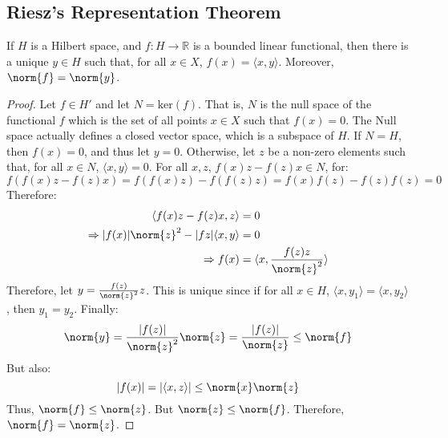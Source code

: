         \subsection{Riesz's Representation Theorem}
            \begin{theorem}
                If $H$ is a Hilbert space, and
                $f:H\rightarrow\mathbb{R}$ is a bounded
                linear functional, then there is a unique
                $y\in{H}$ such that, for all $x\in{X}$,
                $f(x)=\langle{x,y}\rangle$. Moreover,
                $\norm{f}=\norm{y}$.
            \end{theorem}
            \begin{proof}
                Let $f\in{H'}$ and let $N=\mathrm{ker}(f)$. That is,
                $N$ is the null space of the functional $f$
                which is the set of all points
                $x\in{X}$ such that $f(x)=0$. The Null space
                actually defines a closed vector space, which
                is a subspace of $H$. If $N=H$, then
                $f(x)=0$, and thus let $y=0$. Otherwise, let $z$
                be a non-zero elements such that,
                for all $x\in{N}$, $\langle{x,y}\rangle=0$.
                For all $x,z$, $f(x)z-f(z)x\in{N}$, for:
                \begin{equation*}
                    f(f(x)z-f(z)x)
                    =f(f(x)z)-f(f(z)z)
                    =f(x)f(z)-f(z)f(z)=0
                \end{equation*}
                Therefore:
                \begin{align*}
                    \langle{f(x)z-f(z)x,z}\rangle&=0\\
                    \Rightarrow
                    |f(x)|\norm{z}^{2}-|fz|\langle{x,y}\rangle&=0\\
                    \Rightarrow
                    f(x)
                    &=\langle{x,\frac{f(z)z}{\norm{z}^{2}}}\rangle
                \end{align*}
                Therefore, let $y=\frac{f(z)}{\norm{z}^{2}}z$.
                This is unique since if for all $x\in{H}$,
                $\langle{x,y_{1}}\rangle=\langle{x,y_{2}}\rangle$,
                then $y_{1}=y_{2}$. Finally:
                \begin{equation*}
                    \norm{y}
                    =\frac{|f(z)|}{\norm{z}^{2}}\norm{z}
                    =\frac{|f(z)|}{\norm{z}}
                    \leq\norm{f}
                \end{equation*}
                But also:
                \begin{equation*}
                    |f(x)|=|\langle{x,z}\rangle|
                    \leq\norm{x}\norm{z}
                \end{equation*}
                Thus, $\norm{f}\leq\norm{z}$. But
                $\norm{z}\leq\norm{f}$. Therefore,
                $\norm{f}=\norm{z}$.
            \end{proof}
